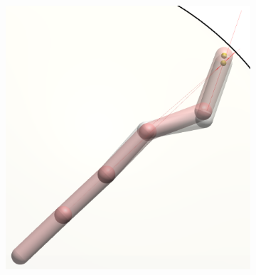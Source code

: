 \begin{figure}[h]
\begin{subfigure}[b]{.35\textwidth}
        \includegraphics[width=\textwidth]{Figures/arm-full-sphere.png}
    \end{subfigure}

    \vspace{1em}


\end{figure}
